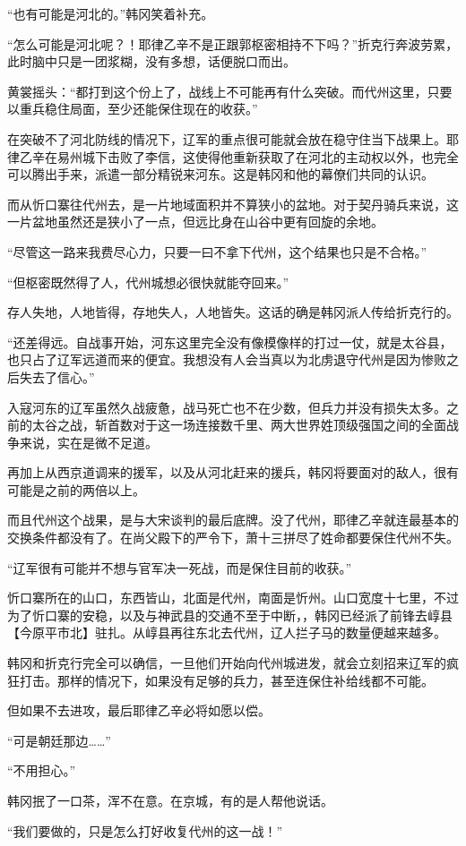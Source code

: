 “也有可能是河北的。”韩冈笑着补充。

“怎么可能是河北呢？！耶律乙辛不是正跟郭枢密相持不下吗？”折克行奔波劳累，此时脑中只是一团浆糊，没有多想，话便脱口而出。

黄裳摇头：“都打到这个份上了，战线上不可能再有什么突破。而代州这里，只要以重兵稳住局面，至少还能保住现在的收获。”

在突破不了河北防线的情况下，辽军的重点很可能就会放在稳守住当下战果上。耶律乙辛在易州城下击败了李信，这使得他重新获取了在河北的主动权以外，也完全可以腾出手来，派遣一部分精锐来河东。这是韩冈和他的幕僚们共同的认识。

而从忻口寨往代州去，是一片地域面积并不算狭小的盆地。对于契丹骑兵来说，这一片盆地虽然还是狭小了一点，但远比身在山谷中更有回旋的余地。

“尽管这一路来我费尽心力，只要一曰不拿下代州，这个结果也只是不合格。”

“但枢密既然得了人，代州城想必很快就能夺回来。”

存人失地，人地皆得，存地失人，人地皆失。这话的确是韩冈派人传给折克行的。

“还差得远。自战事开始，河东这里完全没有像模像样的打过一仗，就是太谷县，也只占了辽军远道而来的便宜。我想没有人会当真以为北虏退守代州是因为惨败之后失去了信心。”

入寇河东的辽军虽然久战疲惫，战马死亡也不在少数，但兵力并没有损失太多。之前的太谷之战，斩首数对于这一场连接数千里、两大世界姓顶级强国之间的全面战争来说，实在是微不足道。

再加上从西京道调来的援军，以及从河北赶来的援兵，韩冈将要面对的敌人，很有可能是之前的两倍以上。

而且代州这个战果，是与大宋谈判的最后底牌。没了代州，耶律乙辛就连最基本的交换条件都没有了。在尚父殿下的严令下，萧十三拼尽了姓命都要保住代州不失。

“辽军很有可能并不想与官军决一死战，而是保住目前的收获。”

忻口寨所在的山口，东西皆山，北面是代州，南面是忻州。山口宽度十七里，不过为了忻口寨的安稳，以及与神武县的交通不至于中断，，韩冈已经派了前锋去崞县【今原平市北】驻扎。从崞县再往东北去代州，辽人拦子马的数量便越来越多。

韩冈和折克行完全可以确信，一旦他们开始向代州城进发，就会立刻招来辽军的疯狂打击。那样的情况下，如果没有足够的兵力，甚至连保住补给线都不可能。

但如果不去进攻，最后耶律乙辛必将如愿以偿。

“可是朝廷那边……”

“不用担心。”

韩冈抿了一口茶，浑不在意。在京城，有的是人帮他说话。

“我们要做的，只是怎么打好收复代州的这一战！”

